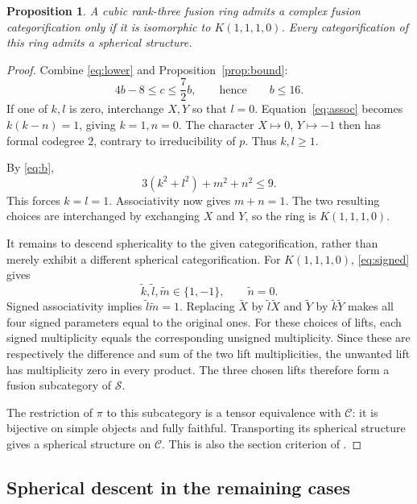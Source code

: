 \documentclass[11pt,a4paper]{article}
\newtheorem{proposition}[theorem]{Proposition}
\theoremstyle{definition}
\theoremstyle{remark}
\newcommand{\cC}{\mathcal C}
\newcommand{\cS}{\mathcal S}
\numberwithin{equation}{section}
\begin{document}
\begin{proposition}\label{prop:cubic-classification}
A cubic rank-three fusion ring admits a complex fusion categorification only if it is isomorphic to $K(1,1,1,0)$. Every categorification of this ring admits a spherical structure.
\end{proposition}
\begin{proof}
Combine \eqref{eq:lower} and Proposition~\ref{prop:bound}:
\[
 4b-8\leq c\leq\frac72b,
 \qquad\text{hence}\qquad b\leq16.
\]
If one of $k,l$ is zero, interchange $X,Y$ so that $l=0$. Equation~\eqref{eq:assoc} becomes $k(k-n)=1$, giving $k=1,n=0$. The character $X\mapsto0$, $Y\mapsto-1$ then has formal codegree $2$, contrary to irreducibility of $p$. Thus $k,l\geq1$.

By \eqref{eq:b},
\[
 3(k^2+l^2)+m^2+n^2\leq9.
\]
This forces $k=l=1$. Associativity now gives $m+n=1$. The two resulting choices are interchanged by exchanging $X$ and $Y$, so the ring is $K(1,1,1,0)$.

It remains to descend sphericality to the given categorification, rather than merely exhibit a different spherical categorification. For $K(1,1,1,0)$, \eqref{eq:signed} gives
\[
 \widetilde k,\widetilde l,\widetilde m\in\{1,-1\},
 \qquad\widetilde n=0.
\]
Signed associativity implies $\widetilde l\widetilde m=1$. Replacing $\widetilde X$ by $\widetilde l\widetilde X$ and $\widetilde Y$ by $\widetilde k\widetilde Y$ makes all four signed parameters equal to the original ones. For these choices of lifts, each signed multiplicity equals the corresponding unsigned multiplicity. Since these are respectively the difference and sum of the two lift multiplicities, the unwanted lift has multiplicity zero in every product. The three chosen lifts therefore form a fusion subcategory of $\cS$.

The restriction of $\pi$ to this subcategory is a tensor equivalence with $\cC$: it is bijective on simple objects and fully faithful. Transporting its spherical structure gives a spherical structure on $\cC$. This is also the section criterion of \cite[Section~5.1(c)]{Ostrik}.
\end{proof}


\subsection{Spherical descent in the remaining cases}\label{sec:quadratic}
\end{document}
